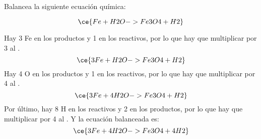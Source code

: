 Balancea la siguiente ecuación química:

\[
    \ce{Fe + H2O -> Fe3O4 + H2}
\]

\begin{solutionbox}{4.5cm}
    Hay 3 Fe en los productos y 1 en los reactivos, por lo que hay que multiplicar por 3 al .
    \[
        \ce{3Fe + H2O -> Fe3O4 + H2}
    \]
    Hay 4 O en los productos y 1 en los reactivos, por lo que hay que multiplicar por 4 al .
    \[
        \ce{3Fe + 4H2O -> Fe3O4 + H2}
    \]
    Por último, hay 8 H en los reactivos y 2 en los productos, por lo que hay que multiplicar por 4 al . Y la ecuación balanceada es:
    \[
        \ce{3Fe + 4H2O -> Fe3O4 + 4H2}
    \]
\end{solutionbox}